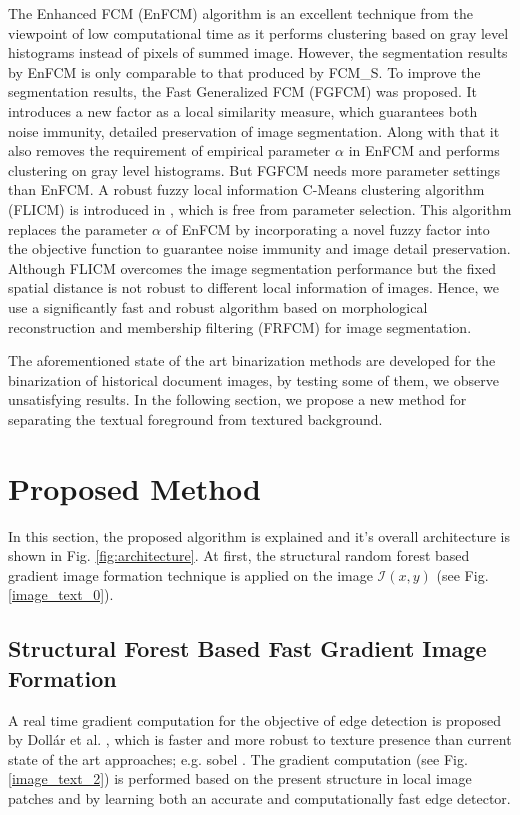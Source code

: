 \documentclass[runningheads]{llncs}
\begin{document}
The Enhanced FCM (EnFCM)\cite{Lei2017} algorithm is an excellent technique from the viewpoint of low computational time as it performs clustering based on gray level histograms instead of pixels of summed image. 
However, the segmentation results by EnFCM is only comparable to that produced by FCM\_S. To improve the segmentation results, the Fast Generalized FCM (FGFCM) \cite{Lei2017} was proposed. It introduces a new factor as a local similarity measure, which guarantees both noise immunity, detailed preservation of image segmentation. 
Along with that it also removes the requirement of empirical parameter $\alpha$ in EnFCM and performs clustering on gray level histograms. But FGFCM needs more parameter settings than EnFCM. 
A robust fuzzy local information C-Means clustering algorithm (FLICM) is introduced in \cite{Lei2017}, which is free from parameter selection. This algorithm replaces the parameter $\alpha$ of EnFCM by incorporating a novel fuzzy factor into the objective function to guarantee noise immunity and image detail preservation. Although FLICM overcomes the image segmentation performance but the fixed spatial distance is not robust to different local information of images. 
Hence, we use a significantly fast and robust algorithm based on morphological reconstruction and membership filtering (FRFCM) \cite{Lei2017} for image segmentation.

The aforementioned state of the art binarization methods are developed for the binarization of historical document images, by testing some of them, we observe unsatisfying results. In the following section, we propose a new method for separating the textual foreground from textured background.  
\section {Proposed Method}
In this section, the proposed algorithm is explained and it's overall architecture is shown in Fig. \ref{fig:architecture}. At first, the structural random forest based gradient image formation technique is applied on the image $\mathcal{I}(x,y)$ (see Fig. \ref{image_text_0}). 
\subsection {Structural Forest Based Fast Gradient Image Formation} \label{structuralForest} A real time gradient computation for the objective of edge detection is proposed by Dollár et al. \cite{Dollar2013}, which is faster and more robust to texture presence than current state of the art approaches; e.g. sobel \cite{Dollar2013}. The gradient computation (see Fig. \ref{image_text_2}) is performed based on the present structure in local image patches and by learning both an accurate and computationally fast edge detector. 
\end{document}
